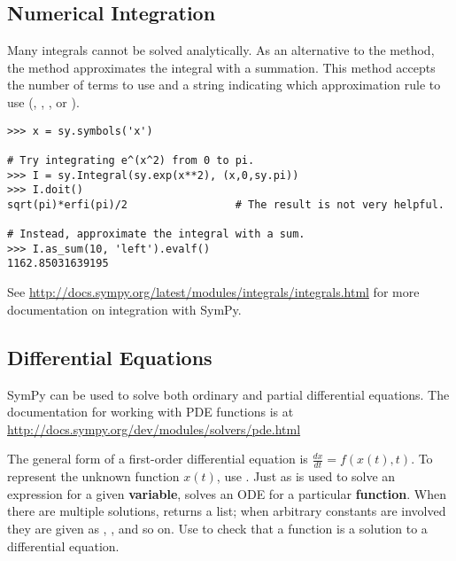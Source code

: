\subsection*{Numerical Integration} %

Many integrals cannot be solved analytically.
As an alternative to the  method, the  method approximates the integral with a summation.
This method accepts the number of terms to use and a string indicating which approximation rule to use (, , , or ).

\begin{lstlisting}
>>> x = sy.symbols('x')

# Try integrating e^(x^2) from 0 to pi.
>>> I = sy.Integral(sy.exp(x**2), (x,0,sy.pi))
>>> I.doit()
sqrt(pi)*erfi(pi)/2                 # The result is not very helpful.

# Instead, approximate the integral with a sum.
>>> I.as_sum(10, 'left').evalf()
1162.85031639195
\end{lstlisting}

See \url{http://docs.sympy.org/latest/modules/integrals/integrals.html} for more documentation on integration with SymPy.

\subsection*{Differential Equations} %

SymPy can be used to solve both ordinary and partial differential equations.
The documentation for working with PDE functions is at \url{http://docs.sympy.org/dev/modules/solvers/pde.html}

The general form of a first-order differential equation is $\frac{dx}{dt} = f(x(t),t)$.
To represent the unknown function $x(t)$, use .
Just as  is used to solve an expression for a given \textbf{variable},  solves an ODE for a particular \textbf{function}.
When there are multiple solutions,  returns a list; when arbitrary constants are involved they are given as , , and so on.
Use  to check that a function is a solution to a differential equation.

